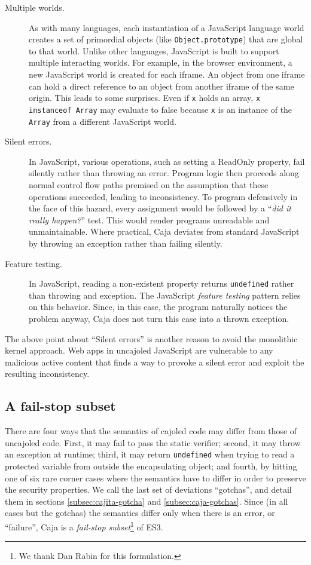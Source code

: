 \documentclass[letterpaper,twocolumn,10pt]{article}
\newcommand{\code}[1]{{\tt {#1}}}              %
\begin{document}
\begin{description}
  \item[Multiple worlds.] As with many languages, each instantiation of a JavaScript language world creates a set of 
  primordial objects (like \code{Object.prototype}) that are global to that world. Unlike other languages, JavaScript 
  is built to support multiple interacting worlds. For example, in the browser environment, a new JavaScript world is 
  created for each iframe. An object from one iframe can hold a direct reference to an object from another iframe of 
  the same origin. This leads to some surprises. Even if \code{x} holds an array, \code{x instanceof Array} may 
  evaluate to false because \code{x} is an instance of the \code{Array} from a different JavaScript world.
  
  \item[Silent errors.] In JavaScript, various operations, such as setting a ReadOnly property, fail silently rather 
  than throwing an error. Program logic then proceeds along normal control flow paths premised on the assumption that 
  these operations succeeded, leading to inconsistency. To program defensively in the face of this hazard, every 
  assignment would be followed by a ``\emph{did it really happen?}'' test. This would render programs unreadable and 
  unmaintainable. Where practical, Caja deviates from standard JavaScript by throwing an exception rather than 
  failing silently.
  
  \item[Feature testing.] In JavaScript, reading a non-existent property returns \code{undefined} rather than 
  throwing and exception. The JavaScript \emph{feature testing} pattern relies on this behavior. Since, in this case, 
  the program naturally notices the problem anyway, Caja does not turn this case into a thrown exception.
    
\end{description}

The above point about ``Silent errors'' is another reason to avoid the monolithic kernel approach. Web apps in 
uncajoled JavaScript are vulnerable to any malicious active content that finds a way to provoke a silent error and 
exploit the resulting inconsistency.

\subsection{A fail-stop subset}
\label{subsec:fail-stop}

There are four ways that the semantics of cajoled code may differ from those of uncajoled code.
First, it may fail to pass the static verifier; second, it may throw an exception at runtime; third, it
may return \code{undefined} when trying to read a protected variable from outside the encapsulating
object; and fourth, by hitting one of six rare corner cases where the semantics have to differ in order
to preserve the security properties.  We call the last set of deviations ``gotchas'', and detail them
in sections \ref{subsec:cajita-gotcha} and \ref{subsec:caja-gotchas}.  Since (in all cases but the gotchas) 
the semantics differ only when there is an error, or ``failure'', Caja is a \emph{fail-stop subset}\footnote{
%
We thank Dan Rabin for this formulation.
%
} of ES3.
\end{document}
